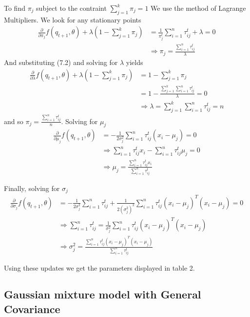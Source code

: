 \documentclass[paper=a4, fontsize=11pt]{scrartcl} %
\numberwithin{equation}{section} %
\numberwithin{figure}{section} %
\numberwithin{table}{section} %
\begin{document}
To find \(\pi_j\) subject to the contraint \(\sum_{j=1}^k \pi_j = 1\) We use the method of Lagrange Multipliers. We look for any stationary points
\begin{align}
\frac{\partial}{\partial \pi_j}f(q_{t+1},\theta) + \lambda\left(1-\sum_{j=1}^k \pi_j\right) &= \frac{1}{\pi_j^t}\sum_{i=1}^{n}\tau_{ij}^{t} + \lambda = 0 \\
&\Rightarrow \pi_j = \frac{\sum_{i=1}^{n}\tau_{ij}^{t}}{\lambda}
\end{align}
And substituting (7.2) and solving for \(\lambda\) yields
\begin{align}
\frac{\partial}{\partial \lambda}f(q_{t+1},\theta) + \lambda\left(1-\sum_{j=1}^k \pi_j\right) &= 1-\sum_{j=1}^k \pi_j \\
&= 1 - \frac{\sum_{j=1}^{k}\sum_{i=1}^{n}\tau_{ij}^{t}}{\lambda}=0\\
&\Rightarrow \lambda = \sum_{j=1}^{k}\sum_{i=1}^{n}\tau_{ij}^{t} = n
\end{align}
and so \(\pi_j= \frac{\sum_{i=1}^{n}\tau_{ij}^{t}}{n}\). Solving for \(\mu_j\)
\begin{align}
\frac{\partial}{\partial \mu_j}f(q_{t+1},\theta) &= -\frac{1}{2\sigma_j^2}\sum_{i=1}^n \tau_{ij}^{t}(x_i - \mu_j) = 0 \\
&\Rightarrow \sum_{i=1}^n \tau_{ij}^{t}x_i - \sum_{i=1}^n\tau_{ij}^{t}\mu_j = 0\\
&\Rightarrow \mu_j = \frac{\sum_{i=1}^n \tau_{ij}^{t}x_i}{\sum_{i=1}^n\tau_{ij}^{t}}
\end{align}

Finally, solving for \(\sigma_j\)
\begin{align}
\frac{\partial}{\partial \sigma_j}f(q_{t+1},\theta) &= -\frac{1}{2\sigma_j^2}\sum_{i=1}^n \tau_{ij}^{t} + \frac{1}{2(\sigma_j^2)^2}\sum_{i=1}^n \tau_{ij}^{t}(x_i-\mu_j)^T(x_i-\mu_j)=0\\
&\Rightarrow \sum_{i=1}^n \tau_{ij}^{t} = \frac{1}{\sigma_j^2}\sum_{i=1}^n \tau_{ij}^{t}(x_i-\mu_j)^T(x_i-\mu_j) \\
&\Rightarrow \sigma_j^2 = \frac{\sum_{i=1}^n \tau_{ij}^{t}(x_i-\mu_j)^T(x_i-\mu_j)}{\sum_{i=1}^n \tau_{ij}^{t}}
\end{align}

Using these updates we get the parameters displayed in table 2.

\subsection{Gaussian mixture model with General Covariance}
\end{document}
